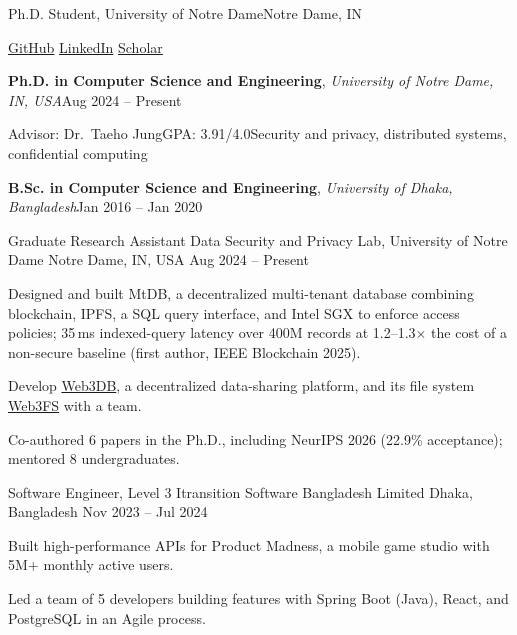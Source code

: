 \documentclass{academic-cv}
\makeatletter
\renewcommand{\makecvheader}{%
  \begin{center}
    {\fontsize{20}{24}\selectfont\scshape\color{accent}\@cvname}\par
    \vspace{3pt}
    {\small
      Ph.D. Student, University of Notre Dame\cvsep Notre Dame, IN\cvsep\mbox{\@cvphone}\cvsep\href{mailto:\@cvemail}{\@cvemail}\par
      \vspace{1pt}
      \href{https://\@cvsite}{\@cvsite}\cvsep
      \href{https://github.com/\@cvgithub}{GitHub}\cvsep
      \href{https://www.linkedin.com/\@cvlinkedin}{LinkedIn}\cvsep
      \href{https://scholar.google.com/citations?user=\@cvscholar}{Scholar}\par}
  \end{center}
  \vspace{-8pt}}
\let\section\cv@origsection
\newcommand{\resdegree}[3]{\textbf{#1}, \textit{#2}\hfill{\small\color{graytext}#3}\par}
\makeatother
\begin{document}
\makecvheader

\section{Education}
\resdegree{Ph.D. in Computer Science and Engineering}{University of Notre Dame, IN, USA}{Aug 2024 -- Present}
{\small Advisor: Dr.\ Taeho Jung\enspace\textperiodcentered\enspace GPA: 3.91/4.0\enspace\textperiodcentered\enspace Security and privacy, distributed systems, confidential computing}\par
\resdegree{B.Sc. in Computer Science and Engineering}{University of Dhaka, Bangladesh}{Jan 2016 -- Jan 2020}

\section{Experience}
\resentry
    {Graduate Research Assistant}
    {Data Security and Privacy Lab, University of Notre Dame}
    {Notre Dame, IN, USA}
    {Aug 2024 -- Present}
\begin{resbullets}
    \item Designed and built MtDB, a decentralized multi-tenant database combining blockchain, IPFS, a SQL query interface, and Intel SGX to enforce access policies; 35\,ms indexed-query latency over 400M records at 1.2--1.3$\times$ the cost of a non-secure baseline (first author, IEEE Blockchain 2025).
    \item Develop \href{https://www.web3db.org/}{Web3DB}, a decentralized data-sharing platform, and its file system \href{https://fs.web3db.org/}{Web3FS} with a team.
    \item Co-authored 6 papers in the Ph.D., including NeurIPS 2026 (22.9\% acceptance); mentored 8 undergraduates.
\end{resbullets}

\resentry
    {Software Engineer, Level 3}
    {Itransition Software Bangladesh Limited}
    {Dhaka, Bangladesh}
    {Nov 2023 -- Jul 2024}
\begin{resbullets}
    \item Built high-performance APIs for Product Madness, a mobile game studio with 5M+ monthly active users.
    \item Led a team of 5 developers building features with Spring Boot (Java), React, and PostgreSQL in an Agile process.
\end{resbullets}
\end{document}
